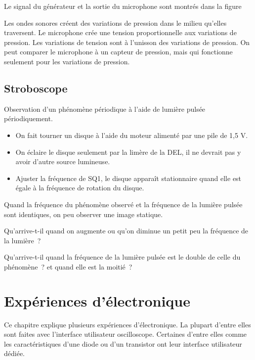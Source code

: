 \documentclass[a4paper,12pt,french]{sphinxmanual}
\let\sphinxpxdimen\pdfpxdimen\else\newdimen\sphinxpxdimen
\begin{document}

Le signal du générateur et la sortie du microphone sont montrés dans la
figure

Les ondes sonores créent des variations de pression dans le milieu
qu’elles traversent. Le microphone crée une tension proportionnelle aux
variations de pression. Les variations de tension sont à l’unisson des
variations de pression. On peut comparer le microphone à un capteur de
pression, mais qui fonctionne seulement pour les variations de pression.


\section{Stroboscope}
\label{\detokenize{2.17:stroboscope}}\label{\detokenize{2.17::doc}}

Observation d’un phénomène périodique à l’aide de lumière pulsée périodiquement.


\noindent\sphinxincludegraphics[width=300\sphinxpxdimen]{{stroboscope}.pdf}
\begin{itemize}
\item {} 
On fait tourner un disque à l’aide du moteur alimenté par une pile de 1,5 V.

\item {} 
On éclaire le disque seulement par la limère de la DEL, il ne devrait
pas y avoir d’autre source lumineuse.

\item {} 
Ajuster la fréquence de SQ1, le disque apparaît stationnaire quand elle est
égale à la fréquence de rotation du disque.

\end{itemize}


Quand la fréquence du phénomène observé et la fréquence de la lumière pulsée
sont identiques, on peu observer une image statique.

Qu’arrive-t-il quand on augmente ou qu’on diminue un petit peu la fréquence de
la lumière ?

Qu’arrive-t-il quand la fréquence de la lumière pulsée est le double de
celle du phénomène ? et quand elle est la moitié ?


\chapter{Expériences d’électronique}
\label{\detokenize{index:experiences-d-electronique}}
Ce chapitre explique plusieurs expériences d’électronique. La plupart
d’entre elles sont faites avec l’interface utilisateur
oscilloscope. Certaines d’entre elles comme les caractéristiques d’une
diode ou d’un transistor ont leur interface utilisateur dédiée.
\end{document}
